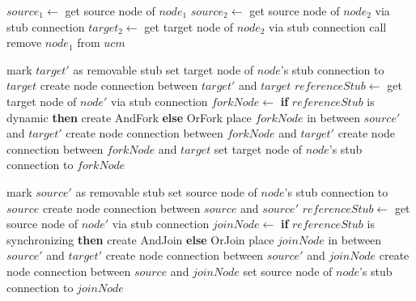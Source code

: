 \begin{algorithm}                     
	\begin{algorithmic}[1]
		
		 \label{alg:2.15}
			\State $source_1\gets$ get source node of $node_1$
			\State $source_2\gets$ get source node of $node_2$ via stub connection
			\State $target_2\gets$ get target node of $node_2$ via stub connection
			\State call 
			\State remove $node_1$ from $ucm$
		\EndFunction \label{alg:2.16}
		
			 \label{alg:2.17}
				\State mark $target'$ as removable stub
				\State set target node of $node$'s stub connection to $target$ \label{alg:2.18}
			 \label{alg:2.19}
				\State create node connection between $target'$ and $target$ \label{alg:2.20}
			\Else \label{alg:2.21}
				\State $referenceStub\gets$ get target node of $node'$ via stub connection
				\State $forkNode\gets$ \textbf{if} $referenceStub$ is dynamic \textbf{then} create {\cls AndFork} \textbf{else} {\cls OrFork}
				\State place $forkNode$ in between $source'$ and $target'$
				\State create node connection between $forkNode$ and $target'$
				\State create node connection between $forkNode$ and $target$
				\State set target node of $node$'s stub connection to $forkNode$
			\EndIf \label{alg:2.22}
		\EndFunction
		
			 \label{alg:2.23}
				\State mark $source'$ as removable stub
				\State set source node of $node$'s stub connection to $source$ \label{alg:2.24}
			 \label{alg:2.25}
				\State create node connection between $source$ and $source'$ \label{alg:2.26}
			\Else \label{alg:2.27}
				\State $referenceStub\gets$ get source node of $node'$ via stub connection
				\State $joinNode\gets$ \textbf{if} $referenceStub$ is synchronizing \textbf{then} create {\cls AndJoin} \textbf{else} {\cls OrJoin}
				\State place $joinNode$ in between $source'$ and $target'$
				\State create node connection between $source'$ and $joinNode$
				\State create node connection between $source$ and $joinNode$
				\State set source node of $node$'s stub connection to $joinNode$
			\EndIf \label{alg:2.28}
		\EndFunction
	\end{algorithmic}
\end{algorithm}

